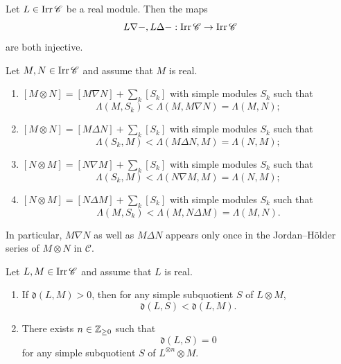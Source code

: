 \begin{Lem}
\label{Lem : hd soc injectivity}
  Let $L \in \mathop{\mathrm{Irr}}\nolimits \mathscr{C}$ be a real module. 
  Then the maps 
  \[
  L \nabla - , L \Delta -: \mathop{\mathrm{Irr}}\nolimits \mathscr{C} \to  \mathop{\mathrm{Irr}}\nolimits \mathscr{C}
  \]
  are both injective. 
\end{Lem}

\begin{Lem}
\label{Lem : Lambda inequalities for heads and socles}
Let $M, N \in \mathop{\mathrm{Irr}}\nolimits\mathscr{C}$ and assume that $M$ is real.
\begin{enumerate}
    \item[(i)] $[M \otimes N] = [M \nabla N] + \sum_k[S_k]$
    with simple modules $S_k$ such that
    \[
    \Lambda(M, S_k) < \Lambda(M, M \nabla N) = \Lambda(M, N);
    \]
    \item[(ii)] $[M \otimes N] = [M \Delta N] + \sum_k[S_k]$
    with simple modules $S_k$ such that
    \[
    \Lambda(S_k, M) < \Lambda(M \Delta N, M) = \Lambda(N, M);
    \]
    \item[(iii)] $[N \otimes M] = [N \nabla M] + \sum_k[S_k]$
    with simple modules $S_k$ such that
    \[
    \Lambda(S_k, M) < \Lambda(N \nabla M, M) = \Lambda(N, M);
    \]
    \item[(iv)] $[N \otimes M] = [N \Delta M] + \sum_k[S_k]$
    with simple modules $S_k$ such that
    \[
    \Lambda(M, S_k) < \Lambda(M, N \Delta M) = \Lambda(M, N).
    \]
\end{enumerate}
In particular, $M \nabla N$ as well as $M \Delta N$
appears only once in the Jordan--H\"older series
of $M \otimes N$ in $\mathscr{C}$.
\end{Lem}

\begin{Lem}
\label{Lem : decrease of d}
Let $L, M \in \mathop{\mathrm{Irr}}\nolimits\mathscr{C}$ and assume that $L$ is real.
\begin{enumerate}
    \item[(i)] If $\mathfrak{d}(L, M) > 0$,
    then for any simple subquotient $S$ of $L \otimes M$,
    \[
    \mathfrak{d}(L, S) < \mathfrak{d}(L, M).
    \]
    \item[(ii)] There exists $n \in \mathbb{Z}_{\geq 0}$ such that
    \[
    \mathfrak{d}(L, S) = 0
    \]
    for any simple subquotient $S$ of $L^{\otimes n}\otimes M$. 
\end{enumerate}
\end{Lem}

